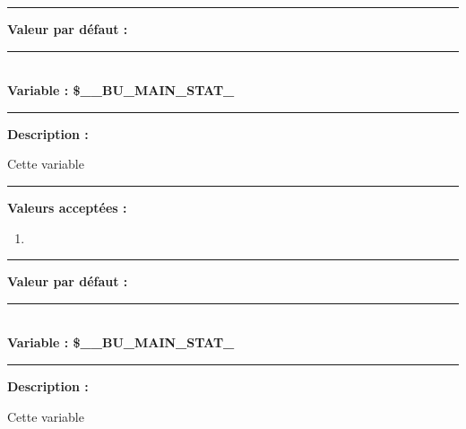 \documentclass[a4paper,10pt]{article}
\begin{document}
\par\noindent\rule{\textwidth}{0.4pt}

\textbf{Valeur par défaut :}



\color{vars}\par\noindent\rule{\textwidth}{0.4pt}\color{text}\\[1\baselineskip]

\textbf{Variable : \color{vars}\$\_\_BU\_MAIN\_STAT\_}\\[1\baselineskip]

\par\noindent\rule{\textwidth}{0.4pt}

\begin{justify}
    \textbf{Description :}
\end{justify}

\setlength{\parskip}{1em}

\begin{justify}
    Cette variable
\end{justify}

\par\noindent\rule{\textwidth}{0.4pt}

\textbf{Valeurs acceptées :}
\begin{enumerate}
    \item 
\end{enumerate}

\par\noindent\rule{\textwidth}{0.4pt}

\textbf{Valeur par défaut :}



\color{vars}\par\noindent\rule{\textwidth}{0.4pt}\color{text}\\[1\baselineskip]

\textbf{Variable : \color{vars}\$\_\_BU\_MAIN\_STAT\_}\\[1\baselineskip]

\par\noindent\rule{\textwidth}{0.4pt}

\begin{justify}
    \textbf{Description :}
\end{justify}

\setlength{\parskip}{1em}

\begin{justify}
    Cette variable
\end{justify}
\end{document}
